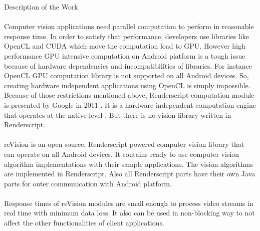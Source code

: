 \documentclass[12pt, a4paper]{article} \pagenumbering{gobble}
\begin{document}
\newpage
\begin{section}{Description of the Work}
\paragraph{}{%
  Computer vision applications need parallel computation to perform in reasonable response time.
  In order to satisfy that performance, developers use libraries like OpenCL and CUDA which move the computation
  load to GPU. However high performance GPU intensive computation on Android platform is a tough issue because
  of hardware dependencies and incompatibilities of libraries. For instance OpenCL GPU computation library is not
  supported on all Android devices. So, creating hardware independent applications using OpenCL is simply impossible.
  Because of those restrictions mentioned above, Renderscript computation module is presented by Google in 2011 \cite{renderscript_release}.
  It is ﻿a hardware-independent computation engine that operates at the native level \cite{renderscript_api}. But there is no vision library
  written in Renderscript.
}
\paragraph{}{%
  reVision is an open source, Renderscript powered computer vision library that can operate on all Android devices.
  It contains ready to use computer vision algorithm implementations with their sample applications. The vision
  algorithms are implemented in Renderscript. Also all Renderscript parts have their own Java parts for outer
  communication with Android platform.
}
\paragraph{}{Response times of reVision modules are small enough to process video streams in real time with minimum data loss. It also can be used in non-blocking way to not affect the other functionalities of client applications.}
\end{section}

\newpage
\end{document}
